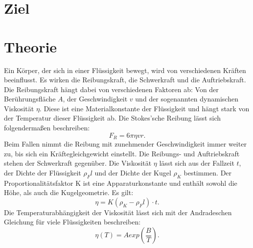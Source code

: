 \section{Ziel}

\section{Theorie}
\label{sec:Theorie}

Ein Körper, der sich in einer Flüssigkeit bewegt, wird von verschiedenen Kräften beeinflusst. 
Es wirken die Reibungskraft, die Schwerkraft und die Auftriebskraft. 
Die Reibungskraft hängt dabei von verschiedenen Faktoren ab:
Von der Berührungsfläche $A$, der Geschwindigkeit $v$ und
der sogenannten dynamischen Viskosität $\eta$. 
Diese ist eine Materialkonstante der Flüssigkeit und hängt stark von der Temperatur dieser Flüssigkeit ab. 
Die Stokes'sche Reibung lässt sich folgendermaßen beschreiben:
\begin{equation}
    F_R = 6\pi \eta v r.
    \label{eq:Stokes}
\end{equation}
Beim Fallen nimmt die Reibung mit zunehmender Geschwindigkeit immer weiter zu, 
bis sich ein Kräftegleichgewicht einstellt. 
Die Reibungs- und Auftriebskraft stehen der Schwerkraft gegenüber. 
Die Viskosität $\eta$ lässt sich aus der Fallzeit $t$, 
der Dichte der Flüssigkeit $\rho_Fl$ und der Dichte der Kugel $\rho_K$ bestimmen.
Der Proportionalitätsfaktor K ist eine Apparaturkonstante und enthält sowohl die Höhe,
als auch die Kugelgeometrie.
Es gilt:
\begin{equation}
    \eta = K (\rho_K -\rho_Fl) \cdot t.
    \label{eq:nu}
\end{equation}
Die Temperaturabhängigkeit der Viskosität lässt sich mit der Andradeschen Gleichung für viele Flüssigkeiten 
beschreiben: 
\begin{equation}
    \eta(T) = A exp(\frac{B}{T}).
    \label{eq:Temperatur}
\end{equation}
